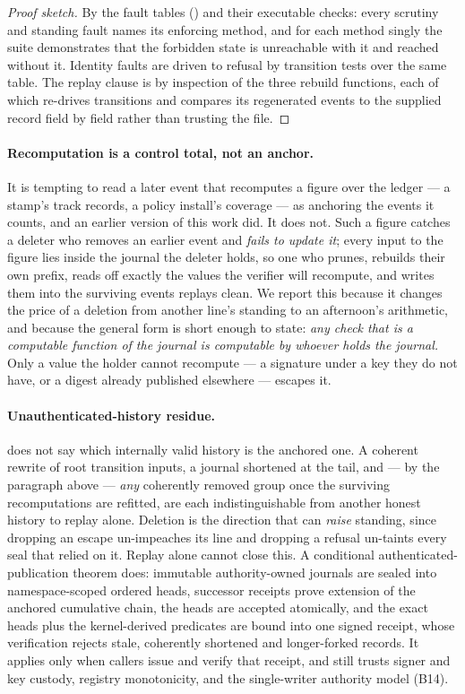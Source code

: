 \documentclass[11pt,a4paper]{article}
\theoremstyle{plain}
\theoremstyle{definition}
\theoremstyle{remark}
\begin{document}
\begin{proof}[Proof sketch]
By the fault tables () and their executable checks: every scrutiny and standing fault names its enforcing method, and for each method singly the suite demonstrates that the forbidden state is unreachable with it and reached without it. Identity faults are driven to refusal by transition tests over the same table. The replay clause is by inspection of the three rebuild functions, each of which re-drives transitions and compares its regenerated events to the supplied record field by field rather than trusting the file.
\end{proof}

\paragraph{Recomputation is a control total, not an anchor.} It is tempting to read a later event that recomputes a figure over the ledger --- a stamp's track records, a policy install's coverage --- as anchoring the events it counts, and an earlier version of this work did. It does not. Such a figure catches a deleter who removes an earlier event and \emph{fails to update it}; every input to the figure lies inside the journal the deleter holds, so one who prunes, rebuilds their own prefix, reads off exactly the values the verifier will recompute, and writes them into the surviving events replays clean. We report this because it changes the price of a deletion from another line's standing to an afternoon's arithmetic, and because the general form is short enough to state: \emph{any check that is a computable function of the journal is computable by whoever holds the journal.} Only a value the holder cannot recompute --- a signature under a key they do not have, or a digest already published elsewhere --- escapes it.

\paragraph{Unauthenticated-history residue.}  does not say which internally valid history is the anchored one. A coherent rewrite of root transition inputs, a journal shortened at the tail, and --- by the paragraph above --- \emph{any} coherently removed group once the surviving recomputations are refitted, are each indistinguishable from another honest history to replay alone. Deletion is the direction that can \emph{raise} standing, since dropping an escape un-impeaches its line and dropping a refusal un-taints every seal that relied on it. Replay alone cannot close this. A conditional authenticated-publication theorem does: immutable authority-owned journals are sealed into namespace-scoped ordered heads, successor receipts prove extension of the anchored cumulative chain, the heads are accepted atomically, and the exact heads plus the kernel-derived predicates are bound into one signed receipt, whose verification rejects stale, coherently shortened and longer-forked records. It applies only when callers issue and verify that receipt, and still trusts signer and key custody, registry monotonicity, and the single-writer authority model (B14).
\end{document}
